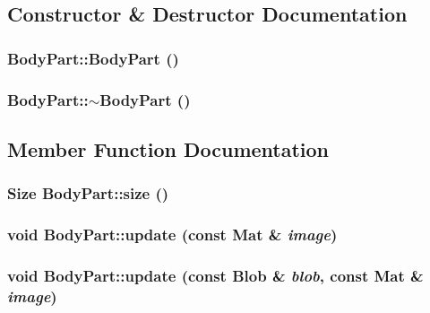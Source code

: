 \subsection{Constructor \& Destructor Documentation}
\hypertarget{class_body_part_a9599eb919a1223d5597f85fedd74085a}{
\subsubsection[{BodyPart}]{\setlength{\rightskip}{0pt plus 5cm}BodyPart::BodyPart ()}}
\label{class_body_part_a9599eb919a1223d5597f85fedd74085a}
\hypertarget{class_body_part_a0d51eaacbf15745175b21bf44f67a92a}{
\subsubsection[{$\sim$BodyPart}]{\setlength{\rightskip}{0pt plus 5cm}BodyPart::$\sim$BodyPart ()}}
\label{class_body_part_a0d51eaacbf15745175b21bf44f67a92a}


\subsection{Member Function Documentation}
\hypertarget{class_body_part_a2a68dbe49c4ebe6b92f78c6c666a2790}{
\subsubsection[{size}]{\setlength{\rightskip}{0pt plus 5cm}Size BodyPart::size ()}}
\label{class_body_part_a2a68dbe49c4ebe6b92f78c6c666a2790}
\hypertarget{class_body_part_a773194f7743a0ef3caba005bf889db9f}{
\subsubsection[{update}]{\setlength{\rightskip}{0pt plus 5cm}void BodyPart::update (const Mat \& {\em image})}}
\label{class_body_part_a773194f7743a0ef3caba005bf889db9f}
\hypertarget{class_body_part_a28774f4b49bb9f45a9d93aecb48ca35c}{
\subsubsection[{update}]{\setlength{\rightskip}{0pt plus 5cm}void BodyPart::update (const {\bf Blob} \& {\em blob}, \/  const Mat \& {\em image})}}
\label{class_body_part_a28774f4b49bb9f45a9d93aecb48ca35c}


